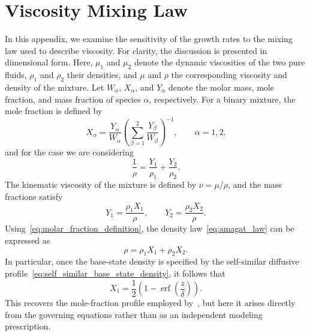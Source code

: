 \documentclass[11pt]{article}
\DeclareMathOperator{\erf}{erf}
\newenvironment{appen}{\appendix}{}
\begin{document}
\begin{appen}
\section{Viscosity Mixing Law}%
\label{sec:appendix_viscosity_law}
In this appendix, we examine the sensitivity of the growth rates to the mixing law used to describe viscosity. For clarity, the discussion is presented in dimensional form. Here, \(\mu_1\) and \(\mu_2\) denote the dynamic viscosities of the two pure fluids, \(\rho_1\) and \(\rho_2\) their densities, and \(\mu\) and \(\rho\) the corresponding viscosity and density of the mixture. Let \(W_{\alpha}\), \(X_{\alpha}\), and \(Y_{\alpha}\) denote the molar mass, mole fraction, and mass fraction of species \(\alpha\), respectively. For a binary mixture, the mole fraction is defined by
\begin{equation}
    \label{eq:molar_fraction_definition}
    X_{\alpha} = \frac{Y_{\alpha}}{W_{\alpha}}
    \left(
        \sum_{\beta=1}^{2} \frac{Y_{\beta}}{W_{\beta}}
    \right)^{-1},
    \qquad \alpha = 1,2.
\end{equation}
and for the case we are considering
\begin{equation}
    \label{eq:amagat_law}
    \frac{1}{\rho} = \frac{Y_1}{\rho_1} + \frac{Y_2}{\rho_2}.
\end{equation}
The kinematic viscosity of the mixture is defined by \(\nu = \mu/\rho\), and the mass fractions satisfy
\begin{equation}
    \label{eq:Y_from_X}
    Y_1 = \frac{\rho_1 X_1}{\rho},
    \qquad
    Y_2 = \frac{\rho_2 X_2}{\rho}.
\end{equation}
Using~\eqref{eq:molar_fraction_definition}, the density law~\eqref{eq:amagat_law} can be expressed as
\begin{equation}
    \rho = \rho_1 X_1 + \rho_2 X_2.
\end{equation}
In particular, once the base-state density is specified by the self-similar diffusive profile~\eqref{eq:self_similar_base_state_density}, it follows that
\begin{equation}
    X_1 = \frac{1}{2}\left(1 - \erf\left(\frac{z}{\delta}\right)\right).
\end{equation}
This recovers the mole-fraction profile employed by~\citet{morgan-likhachev-jacobs-2016}, but here it arises directly from the governing equations rather than as an independent modeling prescription.
\begin{figure}
    \centering
    \begin{minipage}[t]{0.32\textwidth}

\end{minipage}
\end{figure}
\end{appen}
\end{document}
